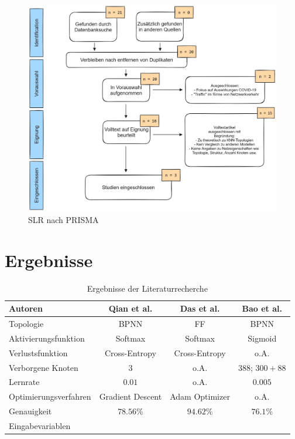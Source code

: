 \documentclass{scrartcl}
\begin{document}
\begin{figure}[h]
   \centering
   \caption{SLR nach PRISMA}
   \label{abb1}
   \includegraphics[scale=0.28]{Bilder/prisma-exported.png}
\end{figure}

\section{Ergebnisse}

\begin{table}[h!]
   \centering
   \caption{Ergebnisse der Literaturrecherche}
   \label{tab1}
   \begin{tabular}{lccc} \toprule
      Autoren               & Qian et al. \cite{qian} & Das et al.  \cite{das} & Bao et al. \cite{bao} \\ \midrule
      Topologie             & BPNN                    & FF                     & BPNN                  \\
      Aktivierungsfunktion  & Softmax                 & Softmax                & Sigmoid               \\
      Verlustsfunktion      & Cross-Entropy           & Cross-Entropy          & o.A.                  \\
      Verborgene Knoten     & $3$                     & o.A.                   & $388$; $300 + 88$     \\
      Lernrate              & $0.01$                  & o.A.                   & $0.005$               \\
      Optimierungsverfahren & Gradient Descent        & Adam Optimizer         & o.A.                  \\
      Genauigkeit           & $78.56 \%$              & $94.62 \%$             & $76.1 \%$             \\
      Eingabevariablen      &                         &                        &                       \\ \bottomrule
   \end{tabular}
\end{table}
\end{document}

